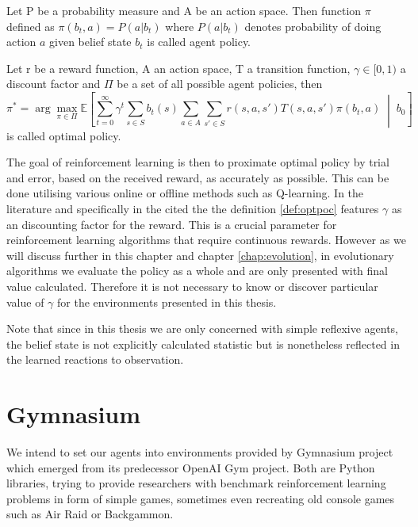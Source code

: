 \begin{defn}
	Let P be a probability measure and A be an action space. Then function $ \pi $ defined as  $ \pi(b_t, a)=P(a|b_t)$ where $ P(a|b_t) $ denotes probability of doing action $ a $ given belief state $ b_t $ is called agent policy. 
\end{defn}
\begin{defn}
	\label{def:optpoc}
	Let r be a reward function, A an action space, T a transition function, $\gamma \in [0,1) $ a discount factor and $ \Pi $ be a set of all possible agent policies, then
\[
\pi^* =
\arg\max_{\pi \in \Pi}
\mathbb{E}
\left[
\sum_{t=0}^{\infty}
\gamma^t
\sum_{s \in S}
b_t(s)
\sum_{a \in A}\sum_{s' \in S}
r(s,a, s')T(s,a,s')\pi(b_t,a)
\;\middle|\;
b_0
\right]
\] is called optimal policy.
\end{defn}
The goal of reinforcement learning is then to proximate optimal policy by trial and error, based on the received reward, as accurately as possible. 
This can be done utilising various online or offline methods such as Q-learning. 
In the literature  and specifically in the cited \cite{DBLP:journals/corr/RossPPC14} the the definition \ref{def:optpoc} features $ \gamma $ as an discounting factor for the reward. This is a crucial parameter for reinforcement learning algorithms that require continuous rewards. However as we will discuss further in this chapter and chapter \ref{chap:evolution}, in evolutionary algorithms we evaluate the policy as a whole and are only presented with final value calculated. Therefore it is not necessary to know or discover particular value of $ \gamma $ for the environments presented in this thesis. 

Note that since in this thesis we are only concerned with simple reflexive agents, the belief state is not explicitly calculated statistic but is nonetheless reflected in the learned reactions to observation.
 
\section{Gymnasium}
We intend to set our agents into environments provided by Gymnasium project which emerged from its predecessor OpenAI Gym project. Both are Python libraries, trying to provide researchers with benchmark reinforcement learning problems in form of simple games, sometimes even recreating old console games such as Air Raid or Backgammon.

